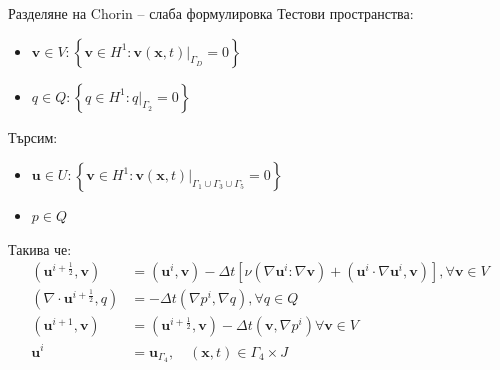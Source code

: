 \documentclass{beamer}
\newcommand{\dotprod}[2]{\left(#1, #2\right)}
\newcommand{\divg}[1]{\nabla\cdot#1}
\newcommand{\grad}[1]{\nabla#1}
\newcommand{\vecf}[1]{\textbf{#1}}
\begin{document}
    \begin{frame}{Разделяне на Chorin -- слаба формулировка}
    		Тестови пространства:
    		\begin{itemize}
    			\item $\mathbf{v} \in V : \left\{\mathbf{v} \in H^1 : \mathbf{v}(\mathbf{x}, t)|_{\Gamma_D} = 0 \right\}$
    			\item $q \in Q : \left\{q \in H^1 : q|_{\Gamma_2} = 0\right\}$
    		\end{itemize}
    		Търсим:
    		\begin{itemize}
    		\item $\mathbf{u} \in U : \left\{\mathbf{v} \in H^1 : \mathbf{v}(\mathbf{x}, t)|_{\Gamma_1 \cup \Gamma_3 \cup \Gamma_5} = 0\right\}$
    		\item $p \in Q$
    		\end{itemize}
    		Такива че:
    		\begin{align*}
    			\dotprod{\vecf{u}^{i + \frac{1}{2}}}{\vecf{v}} &= \dotprod{\vecf{u}^i}{\vecf{v}} - \Delta t \left[\nu\left(\grad{\vecf{u}^i} : \grad{\vecf{v}}\right) + \dotprod{\vecf{u}^i \cdot \grad{\vecf{u}^i}}{\vecf{v}}\right], \forall\mathbf{v} \in V \\
    			\dotprod{\divg{\vecf{u}^{i + \frac{1}{2}}}}{q} &= - \Delta t \dotprod{\grad{p^i}}{\grad{q}}, \forall q \in Q\\
    			\dotprod{\vecf{u}^{i+1}}{\vecf{v}} &= \dotprod{\vecf{u}^{i+\frac{1}{2}}}{\vecf{v}} - \Delta t\dotprod{\vecf{v}} {\grad{p^i}} \forall\mathbf{v} \in V \\
    			 \vecf{u}^i &= \vecf{u}_{\Gamma_4}, \quad \left(\mathbf{x}, t\right) \in \Gamma_4 \times J
    		\end{align*}
    \end{frame}
\end{document}
